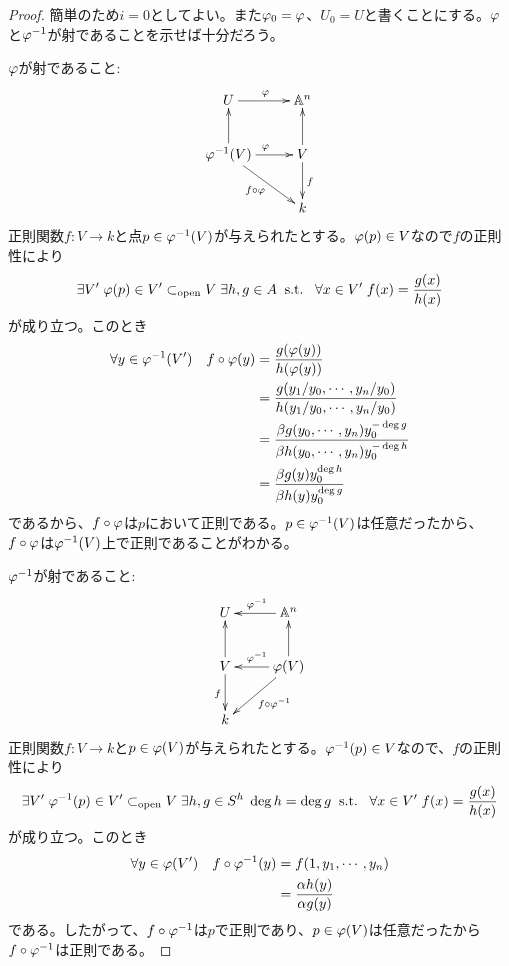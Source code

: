 \begin{proof}
簡単のため$i = 0$としてよい。また${\varphi}_0 = {\varphi}$、$U_0 = U$と書くことにする。${\varphi}$と${\varphi}^{-1}$が射であることを示せば十分だろう。

${\varphi}$が射であること:
  \[
  \xymatrix{
  U \ar[r]^{\vp} & \A^n \\
  \vp^{-1}(V) \ar[u] \ar[r]^{\vp} \ar[dr]_{f \circ \vp} & V \ar[u] \ar[d]^f \\
  {} & k
  }
  \]
  正則関数$f \colon V \to k$と点$p \in {\varphi}^{-1}(V)$が与えられたとする。${\varphi}(p) \in V$なので$f$の正則性により
  \[
  \exists V' \; {\varphi}(p) \in V' \subset_{\text{open}} V \; \exists h,g \in A  \; \; \text{s.t.} \; \; \; \forall x \in V' \; f(x) = \frac{g(x)}{h(x)}
  \]
  が成り立つ。このとき
  \begin{align*}
    \forall y \in {\varphi}^{-1}(V') \quad f \circ {\varphi}(y) &= \frac{g({\varphi}(y))}{h({\varphi}(y))} \\
    &= \frac{g(y_1 / y_0, \cdots , y_n/y_0 )}{h(y_1 / y_0, \cdots , y_n/y_0 )} \\
    &= \frac{\beta g(y_0 , \cdots , y_n)y_0^{- \deg g} }{\beta h(y_0 , \cdots , y_n )y_0^{- \deg h}} \\
    &= \frac{\beta g(y) y_0^{ \deg h} }{\beta h(y) y_0^{\deg g}} \\
  \end{align*}
  であるから、$f \circ {\varphi}$は$p$において正則である。$p \in {\varphi}^{-1}(V)$は任意だったから、$f \circ {\varphi}$は${\varphi}^{-1}(V)$上で正則であることがわかる。

${\varphi}^{-1}$が射であること:
  \[
  \xymatrix{
  U  & \A^n \ar[l]_{\vp^{-1}} \\
  V  \ar[u] \ar[d]_f   &  \vp(V) \ar[u] \ar[l]_{\vp^{-1}}  \ar[dl]^{f \circ \vp^{-1}} \\
  k &  {}
  }
  \]
  正則関数$f \colon V \to k$と$p \in {\varphi}(V)$が与えられたとする。${\varphi}^{-1}(p) \in V$なので、$f$の正則性により
  \[
  \exists V' \; {\varphi}^{-1}(p) \in V' \subset_{\text{open}} V \; \exists h,g \in S^h  \; \deg h = \deg g \; \; \text{s.t.} \; \; \; \forall x \in V' \; f(x) = \frac{g(x)}{h(x)}
  \]
  が成り立つ。このとき
  \begin{align*}
    \forall y \in {\varphi}(V') \quad f \circ {\varphi}^{-1}(y) &= f(1,y_1, \cdots , y_n) \\
    &= \frac{{\alpha} h(y)}{{\alpha} g(y)}
  \end{align*}
  である。したがって、$f \circ {\varphi}^{-1}$は$p$で正則であり、$p \in {\varphi}(V)$は任意だったから$f \circ {\varphi}^{-1}$は正則である。
\end{proof}



